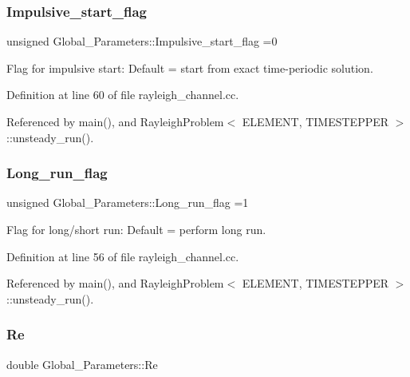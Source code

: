 \subsubsection{\texorpdfstring{Impulsive\+\_\+start\+\_\+flag}{Impulsive\_start\_flag}}
{\footnotesize\ttfamily unsigned Global\+\_\+\+Parameters\+::\+Impulsive\+\_\+start\+\_\+flag =0}



Flag for impulsive start\+: Default = start from exact time-\/periodic solution. 



Definition at line 60 of file rayleigh\+\_\+channel.\+cc.



Referenced by main(), and Rayleigh\+Problem$<$ E\+L\+E\+M\+E\+N\+T, T\+I\+M\+E\+S\+T\+E\+P\+P\+E\+R $>$\+::unsteady\+\_\+run().

\mbox{\label{namespaceGlobal__Parameters_a457472b8222bb6bb0d97b2aed78d1ef4}} 
\subsubsection{\texorpdfstring{Long\+\_\+run\+\_\+flag}{Long\_run\_flag}}
{\footnotesize\ttfamily unsigned Global\+\_\+\+Parameters\+::\+Long\+\_\+run\+\_\+flag =1}



Flag for long/short run\+: Default = perform long run. 



Definition at line 56 of file rayleigh\+\_\+channel.\+cc.



Referenced by main(), and Rayleigh\+Problem$<$ E\+L\+E\+M\+E\+N\+T, T\+I\+M\+E\+S\+T\+E\+P\+P\+E\+R $>$\+::unsteady\+\_\+run().

\mbox{\label{namespaceGlobal__Parameters_a9d72e94a9305c6a310940a6a427ebe06}} 
\subsubsection{\texorpdfstring{Re}{Re}}
{\footnotesize\ttfamily double Global\+\_\+\+Parameters\+::\+Re}




